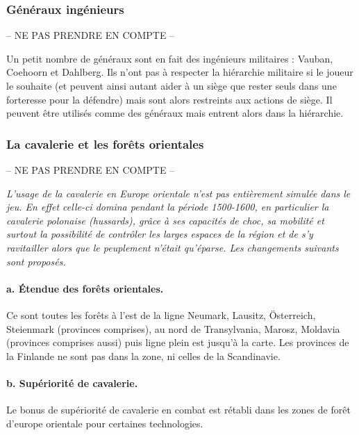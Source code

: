\subsubsection{Généraux ingénieurs}
-- NE PAS PRENDRE EN COMPTE --

Un petit nombre de généraux sont en fait des ingénieurs militaires :
Vauban, Coehoorn et Dahlberg. Ils n'ont pas à respecter la
hiérarchie militaire si le joueur le souhaite (et peuvent ainsi autant
aider à un siège que rester seuls dans une forteresse pour
la défendre) mais sont alors restreints aux actions de siège.
Il peuvent être utilisés comme des généraux mais entrent
alors dans la hiérarchie.



\subsubsection{La cavalerie et les forêts orientales}\label{foretOrientale}
-- NE PAS PRENDRE EN COMPTE --

\textit{
L'usage de la cavalerie en Europe orientale n'est pas entièrement
simulée dans le jeu. En effet celle-ci domina pendant la période
1500-1600, en particulier la cavalerie polonaise (hussards), grâce à ses
capacités de choc, sa mobilité et surtout la possibilité de contrôler
les larges espaces de la région et de s'y ravitailler alors que le
peuplement n'était qu'éparse. Les changements suivants sont proposés.}

\paragraph{a. Étendue des forêts orientales.}
Ce sont toutes les forêts à l'est de la ligne Neumark, Lausitz,
\"Osterreich, Steienmark (provinces comprises), au nord de
Transylvania, Marosz, Moldavia (provinces comprises aussi)
puis ligne plein est jusqu'à la carte. Les provinces de la Finlande
ne sont pas dans la zone, ni celles de la Scandinavie.


\paragraph{b. Supériorité de cavalerie.}
Le bonus de supériorité de cavalerie en combat est rétabli
dans les zones de forêt d'europe orientale pour certaines 
technologies.

